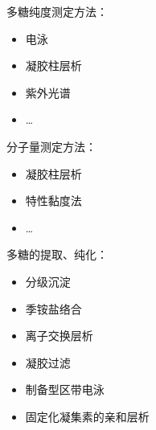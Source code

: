 多糖纯度测定方法：
\begin{itemize}
    \item 电泳
    \item 凝胶柱层析
    \item 紫外光谱
    \item \ldots
\end{itemize}
分子量测定方法：
\begin{itemize}
    \item 凝胶柱层析
    \item 特性黏度法
    \item \ldots 
\end{itemize}
多糖的提取、纯化：
\begin{itemize}
    \item 分级沉淀
    \item 季铵盐络合
    \item 离子交换层析
    \item 凝胶过滤
    \item 制备型区带电泳
    \item 固定化凝集素的亲和层析
\end{itemize}

